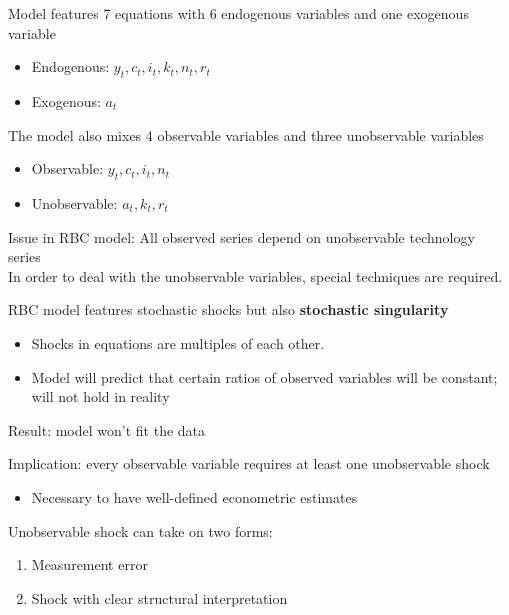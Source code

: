 \documentclass{beamer}
\begin{document}
\begin{frame}
  Model features 7 equations with 6 endogenous variables and one exogenous variable
\begin{itemize}
  \item Endogenous: $y_t,c_t,i_t,k_t,n_t,r_t$
  \item Exogenous: $a_t$
\end{itemize}
\medskip
The model also mixes 4 observable variables and three unobservable variables
\begin{itemize}
  \item Observable: $y_t,c_t,i_t,n_t$
  \item Unobservable: $a_t, k_t, r_t$
\end{itemize}
Issue in RBC model: All observed series depend on unobservable technology series\\
In order to deal with the unobservable variables, special techniques are required. 
\end{frame}

\begin{frame}
  RBC model features stochastic shocks but also \textbf{stochastic singularity}
  \begin{itemize}
    \item Shocks in equations are multiples of each other. 
    \item Model will predict that certain ratios of observed variables will be constant; will not hold in reality
  \end{itemize}
  \medskip
  Result: model won't fit the data
\end{frame}

\begin{frame}
 Implication: every observable variable requires at least one unobservable shock
 \begin{itemize}
   \item Necessary to have well-defined econometric estimates
 \end{itemize}
 \medskip
  Unobservable shock can take on two forms: 
\begin{enumerate}
  \item Measurement error
  \item Shock with clear structural interpretation
\end{enumerate}
\end{frame}
\end{document}

